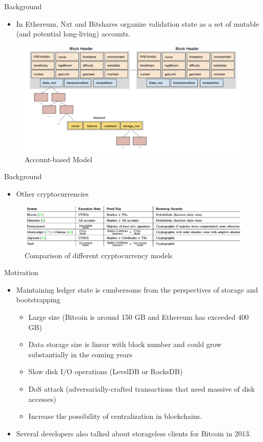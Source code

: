 \documentclass[biblatex,aspectratio=169,11pt]{mybeamer}
\begin{document}
\begin{frame}{Background}
  \begin{itemize}
    \item In Ethereum, Nxt and Bitshares organize \alert{validation state} as a set of mutable (and potential long-living) \alert{accounts}.
  \end{itemize}
  \vspace{-1em}
  \begin{figure}
    \includegraphics[width=0.7\linewidth]{figs/account.png}
    \caption{Account-based Model}
  \end{figure}
\end{frame}

\begin{frame}{Background}
  \begin{itemize}
    \item Other cryptocurrencies
  \end{itemize}
  \vspace{-1em}
  \begin{figure}
    \includegraphics[width=0.9\linewidth]{figs/summary.png}
    \caption{Comparison of different cryptocurrency models }
  \end{figure}
\end{frame}

\begin{frame}{Motivation}
  \begin{itemize}
    \item Maintaining ledger state is cumbersome from the perspectives of \alert{storage} and \alert{bootstrapping}
    \begin{itemize}
       \item Large size (Bitcoin is around 150 GB and Ethereum has exceeded 400 GB)
       \item Data storage size is linear with block number and could grow substantially in the coming years
       \item Slow disk I/O operations (LevelDB or RocksDB)
       \item DoS attack (adversarially-crafted transactions that need massive of disk accesses)
       \item Increase the possibility of centralization in blockchains.
    \end{itemize}
    \item Several developers also talked about \alert{storageless clients} for Bitcoin in 2013.
  \end{itemize}
\end{frame}
\end{document}
